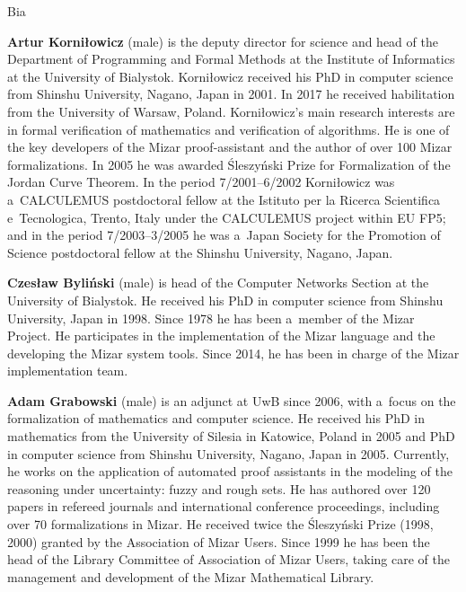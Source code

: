 \begin{sitedescription}{Bia}
\begin{compactitem}
\item\textbf{Artur Korniłowicz} (male) is the deputy director for science 
and head of the Department of Programming and Formal Methods
at the Institute of Informatics at the University of Bialystok.
Korniłowicz received his PhD in computer science from Shinshu University, Nagano, Japan in 2001.
In 2017 he received habilitation from the University of Warsaw, Poland.
Korniłowicz's main research interests are in formal verification of mathematics and verification of algorithms.
He is one of the key developers of the Mizar proof-assistant and the author of over 100 Mizar formalizations.
In 2005 he was awarded Śleszyński Prize for Formalization of the Jordan Curve Theorem.
In the period 7/2001--6/2002 Korniłowicz was a~CALCULEMUS postdoctoral fellow
at the Istituto per la Ricerca Scientifica e~Tecnologica, Trento, Italy under the CALCULEMUS project within EU FP5;
and in the period 7/2003--3/2005 he was a~Japan Society for the Promotion of Science 
postdoctoral fellow at the Shinshu University, Nagano, Japan.

\item\textbf{Czesław Byliński} (male) is head of the Computer Networks Section at the University of Bialystok.
He received his PhD in computer science from Shinshu University, Japan in 1998.
Since 1978 he has been a~member of the Mizar Project.
He participates in the implementation of the Mizar language and the developing the Mizar system tools. 
Since 2014, he has been in charge of the Mizar implementation team.

\item\textbf{Adam Grabowski} (male) is an adjunct at UwB since 2006, 
with a~focus on the formalization of mathematics and computer science.
He received his PhD in mathematics from the University of Silesia in Katowice, Poland in 2005 
and PhD in computer science from Shinshu University, Nagano, Japan in 2005.
Currently, he works on the application of automated proof assistants
in the modeling of the reasoning under uncertainty: fuzzy and rough sets.
He has authored over 120 papers in refereed journals and international conference
proceedings, including over 70 formalizations in Mizar.
He received twice the Śleszyński Prize (1998, 2000) granted by the Association of Mizar Users.
Since 1999 he has been the head of the Library Committee of Association of Mizar Users, taking care of
the management and development of the Mizar Mathematical Library.


\end{compactitem}
\end{sitedescription}
